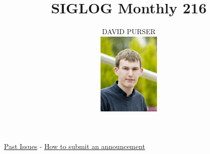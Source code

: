 \documentclass[prodmode,acmtecs]{acmsmall} %
\newcounter{colstart}
\begin{document}
\setcounter{colstart}{\thepage}

\title{\huge\sc SIGLOG Monthly 216}
\author{DAVID PURSER
\vspace*{-2.6cm}\begin{flushright}\includegraphics[width=30mm]{dp}\end{flushright}
}

\maketitlee

\href{https://lics.siglog.org/newsletters/}{Past Issues}
 - 
\href{https://lics.siglog.org/newsletters/inst.html}{How to submit an announcement}
\end{document}

